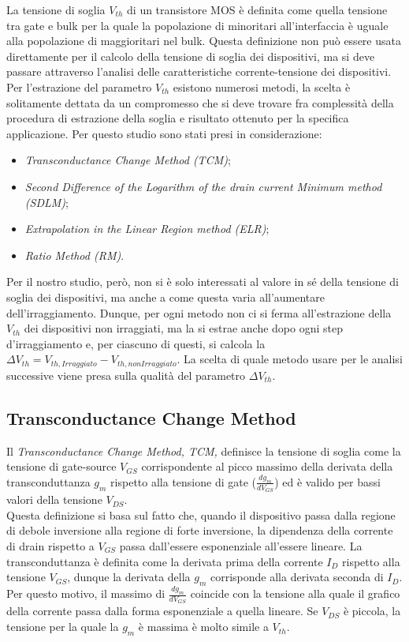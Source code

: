 La tensione di soglia $V_{th}$ di un transistore MOS è definita come quella tensione tra gate e bulk per la quale la popolazione di minoritari all'interfaccia è uguale alla popolazione di maggioritari nel bulk. Questa definizione non può essere usata direttamente per il calcolo della tensione di soglia dei dispositivi, ma si deve passare attraverso l'analisi delle caratteristiche corrente-tensione dei dispositivi. \\
Per l'estrazione del parametro $V_{th}$ esistono numerosi metodi\cite{art2}, la scelta è solitamente dettata da un compromesso che si deve trovare fra complessità della procedura di estrazione della soglia e risultato ottenuto per la specifica applicazione. Per questo studio sono stati presi in considerazione:

\begin{itemize}
  \item \emph{Transconductance Change Method (TCM)};
  \item \emph{Second Difference of the Logarithm of the drain current Minimum method (SDLM)};
  \item \emph{Extrapolation in the Linear Region method (ELR)};
  \item \emph{Ratio Method (RM)}.
\end{itemize}

Per il nostro studio, però, non si è solo interessati al valore in sé della tensione di soglia dei dispositivi, ma anche a come questa varia all'aumentare dell'irraggiamento. Dunque, per ogni metodo non ci si ferma all'estrazione della $V_{th}$ dei dispositivi non irraggiati, ma la si estrae anche dopo ogni step d'irraggiamento e, per ciascuno di questi, si calcola la $\Delta V_{th} = V_{th, Irraggiato}-V_{th, non Irraggiato}$. La scelta di quale metodo usare per le analisi successive viene presa sulla qualità del parametro $\Delta V_{th}$.

\subsection[TCM]{Transconductance Change Method}
Il \emph{Transconductance Change Method, TCM,} definisce la tensione di soglia come la tensione di gate-source $V_{GS}$ corrispondente al picco massimo della derivata della transconduttanza $g_m$ rispetto alla tensione di gate ($\frac{dg_m}{dV_ {GS}}$) ed è valido per bassi valori della tensione $V_{DS}$.\\
Questa definizione si basa sul fatto che, quando il dispositivo passa dalla regione di debole inversione alla regione di forte inversione, la dipendenza della corrente di drain rispetto a $V_{GS}$ passa dall'essere esponenziale all'essere lineare.
La transconduttanza è definita come la derivata prima della corrente $I_D$ rispetto alla tensione $V_{GS}$, dunque la derivata della $g_m$ corrisponde alla derivata seconda di $I_D$. Per questo motivo, il massimo di $\frac{dg_m}{dV_{GS}}$ coincide con la tensione alla quale il grafico della corrente passa dalla forma esponenziale a quella lineare. Se $V_{DS}$ è piccola, la tensione per la quale la $g_m$ è massima è molto simile a $V_{th}$.

